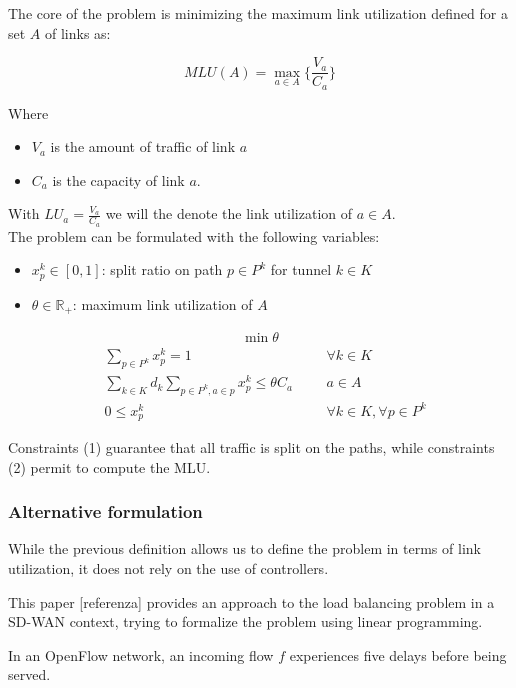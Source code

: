 \documentclass{article}
\begin{document}
The core of the problem is minimizing the
maximum link utilization defined for a set $A$ of links as:

\[
	MLU(A) = \max_{a \in A}\{ \frac{V_a}{C_a} \}
\]

Where \begin{itemize}
	\item $V_a$ is the amount of traffic of link $a$
	\item $C_a$ is the capacity of link $a$.
\end{itemize}

With $LU_a = \frac{V_a}{C_a}$ we will the denote the link utilization of $a \in A$. \\

The problem can be formulated with the following variables:
\begin{itemize}
	\item $x^k_p \in [0,1]$: split ratio on path $p \in P^k$ for tunnel $k \in K$
	\item $\theta \in \mathbb{R}_+$: maximum link utilization of $A$
\end{itemize}

\begin{align*}
	\min \theta
\end{align*}
\begin{align}
	&\sum_{p \in P^{k}} x^k_p = 1
	&   && \forall k\in K \\ \label{constraint_1}
	&\sum_{k \in K} d_k 	\sum_{p \in P^k, a \in p} x^k_p \le \theta C_a 
	&   &&  a \in A \\ 
	& 0 \le x^k_p
	&   &&  \forall k\in K, \forall p \in P^k
\end{align}

Constraints (1) guarantee that all traffic is split on the paths, while constraints (2) permit to compute the MLU.

\subsubsection{Alternative formulation}
While the previous definition allows us to define the problem in terms of link utilization, it does not rely on the use of controllers.

This paper [referenza] provides an approach to the load balancing problem in a SD-WAN context, trying to formalize the problem using linear programming.

In an OpenFlow network, an incoming flow $f$ experiences five delays before being served.
\end{document}
